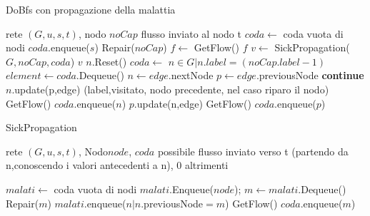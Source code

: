 \documentclass{article}
\begin{document}
\begin{algorithm}
\caption{DoBfs con propagazione della malattia}
\begin{algorithmic}
\REQUIRE rete $(G,u,s,t)$, nodo $noCap$
\ENSURE flusso inviato al nodo t
\STATE $coda \leftarrow$ coda vuota di nodi
\STATE $coda$.enqueue($s$)
\ELSE
\STATE Repair($noCap$) 
\STATE $f \leftarrow$ GetFlow() 
\RETURN $f$
\ENDIF
\ENDIF
\STATE $v \leftarrow$ SickPropagation($G,noCap,coda$)
\RETURN $v$
\ENDIF
{}
\STATE $n.$Reset()
\ENDFOR
{}
\STATE $coda \leftarrow$ $n \in G | n.label = (noCap.label - 1)$
\ENDIF
\ENDIF
{}
\STATE $element \leftarrow coda$.Dequeue()
\STATE $n \leftarrow edge.$nextNode
\STATE $p \leftarrow edge$.previousNode 
\STATE \textbf{continue}
\ENDIF
{}
\STATE $n.$update(p,edge) (label,visitato, nodo precedente, nel caso riparo il nodo)
\RETURN GetFlow()
\ELSE
\STATE $coda$.enqueue($n$)
\ENDIF
{}
\STATE $p$.update(n,edge)
\RETURN GetFlow()
\ELSE
\STATE $coda$.enqueue($p$)
\ENDIF
\ENDIF
\ENDFOR
\ENDWHILE
{}

\end{algorithmic}
\end{algorithm}
\begin{algorithm}
\caption{SickPropagation}
\begin{algorithmic}
\REQUIRE rete $(G,u,s,t)$, Nodo$ node$, $coda$
\ENSURE possibile flusso inviato verso t (partendo da n,conoscendo i valori antecedenti a n), 0 altrimenti

\STATE $malati \leftarrow$ coda vuota di nodi
\STATE $malati$.Enqueue($node$);
\STATE $m \leftarrow malati$.Dequeue()
\STATE Repair($m$)
\STATE $malati$.enqueue($n |  n.$previousNode$ = m$)
\RETURN GetFlow()
\ELSE
\STATE $coda$.enqueue($m$)
\ENDIF
\ENDWHILE
{}
\end{algorithmic}
\end{algorithm}
\end{document}
